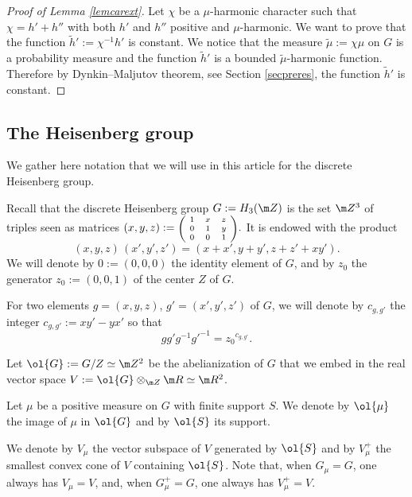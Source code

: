 \begin{proof}[Proof of Lemma \ref{lemcarext}]
Let $\chi$ be a $\mu$-harmonic character
such that $\chi=h'+h''$
with both $h'$ and $h''$
positive and $\mu$-harmonic.
We want to prove that the function $\widetilde{h}':=\chi^{-1}h'$
is constant.
We notice that the measure $\widetilde\mu:=\chi\mu$ on $G$
is a probability measure and the function $\widetilde h'$
is a bounded $\widetilde\mu$-harmonic function.
Therefore by Dynkin--Maljutov theorem,
see Section \ref{secpreres}, the function $\widetilde h'$ is constant.
\end{proof}

\subsection{The Heisenberg group}
\label{secheigro}

\bq
We gather here notation that we will use in this article
for the discrete Heisenberg group.
\eq

Recall that the discrete Heisenberg group $G:=H_3(\m Z)$ is the set $\m Z^3$
of triples seen as matrices
$(x,y,z):=\mbox{\scriptsize
$\left(\!
\begin{array}{ccc} 1 &x&z \\
0 &1&y\\
0&0&1
\end{array}\!
\right)$}.
$
It is endowed with the product
\begin{equation}
\label{eqnprohei}
(x,y,z)\, (x',y',z')= (x+x',y+y',z+z'+xy').
\end{equation}
We will denote by $0:=(0,0,0)$ the identity element of $G$,
and by $z_0$ the generator $z_0:=(0,0,1)$ of the center $Z$ of $G$.

For two elements $g=(x,y,z)$, $g'=(x',y',z')$ of $G$, we will denote
by $c_{g,g'}$ the integer $c_{g,g'}:=xy'\!-\!yx'$ so that
\begin{equation}
\label{eqncggzoc}
gg'g^{-1}{g'}^{-1}={z_0}^{c_{g,g'}}.
\end{equation}

Let $\ol{G}:=G/Z\simeq \m Z^2$ be the abelianization of $G$
that we embed in the real vector space
$V:=\ol{G}\otimes_{\m Z}\m R\simeq \m R^2$.

Let $\mu$ be a positive measure on $G$ with finite support $S$.
We denote by $\ol{\mu}$ the image of $\mu$ in $\ol{G}$ and
by $\ol{S}$ its support.

We denote by $V_\mu$ the vector subspace of $V$ generated by $\ol{S}$
and by $V^+_\mu$ the smallest convex cone of $V$ containing $\ol{S}$.
Note that, when $G_\mu=G$, one always has $V_\mu=V$,
and, when $G^+_\mu=G$, one always has $V^+_\mu=V$.

